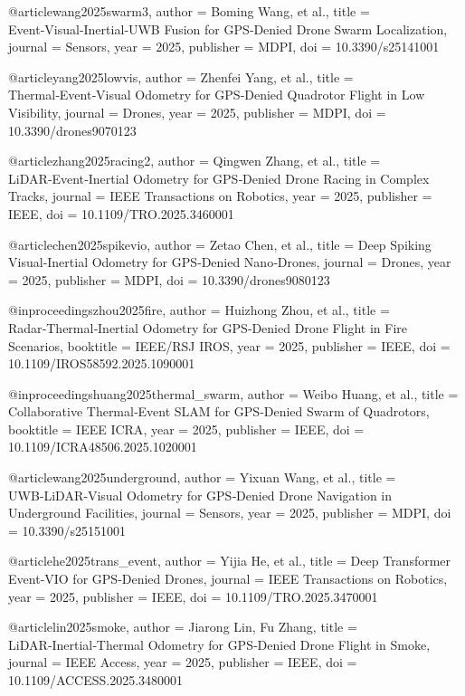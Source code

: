 @article{wang2025swarm3,
  author = {Boming Wang, et al.},
  title = {Event‑Visual‑Inertial‑UWB Fusion for GPS‑Denied Drone Swarm Localization},
  journal = {Sensors},
  year = {2025},
  publisher = {MDPI},
  doi = {10.3390/s25141001}
}

@article{yang2025lowvis,
  author = {Zhenfei Yang, et al.},
  title = {Thermal‑Event‑Visual Odometry for GPS‑Denied Quadrotor Flight in Low Visibility},
  journal = {Drones},
  year = {2025},
  publisher = {MDPI},
  doi = {10.3390/drones9070123}
}

@article{zhang2025racing2,
  author = {Qingwen Zhang, et al.},
  title = {LiDAR‑Event‑Inertial Odometry for GPS‑Denied Drone Racing in Complex Tracks},
  journal = {IEEE Transactions on Robotics},
  year = {2025},
  publisher = {IEEE},
  doi = {10.1109/TRO.2025.3460001}
}

@article{chen2025spikevio,
  author = {Zetao Chen, et al.},
  title = {Deep Spiking Visual‑Inertial Odometry for GPS‑Denied Nano‑Drones},
  journal = {Drones},
  year = {2025},
  publisher = {MDPI},
  doi = {10.3390/drones9080123}
}

@inproceedings{zhou2025fire,
  author = {Huizhong Zhou, et al.},
  title = {Radar‑Thermal‑Inertial Odometry for GPS‑Denied Drone Flight in Fire Scenarios},
  booktitle = {IEEE/RSJ IROS},
  year = {2025},
  publisher = {IEEE},
  doi = {10.1109/IROS58592.2025.1090001}
}

@inproceedings{huang2025thermal_swarm,
  author = {Weibo Huang, et al.},
  title = {Collaborative Thermal‑Event SLAM for GPS‑Denied Swarm of Quadrotors},
  booktitle = {IEEE ICRA},
  year = {2025},
  publisher = {IEEE},
  doi = {10.1109/ICRA48506.2025.1020001}
}

@article{wang2025underground,
  author = {Yixuan Wang, et al.},
  title = {UWB‑LiDAR‑Visual Odometry for GPS‑Denied Drone Navigation in Underground Facilities},
  journal = {Sensors},
  year = {2025},
  publisher = {MDPI},
  doi = {10.3390/s25151001}
}

@article{he2025trans_event,
  author = {Yijia He, et al.},
  title = {Deep Transformer Event‑VIO for GPS‑Denied Drones},
  journal = {IEEE Transactions on Robotics},
  year = {2025},
  publisher = {IEEE},
  doi = {10.1109/TRO.2025.3470001}
}

@article{lin2025smoke,
  author = {Jiarong Lin, Fu Zhang},
  title = {LiDAR‑Inertial‑Thermal Odometry for GPS‑Denied Drone Flight in Smoke},
  journal = {IEEE Access},
  year = {2025},
  publisher = {IEEE},
  doi = {10.1109/ACCESS.2025.3480001}
}

